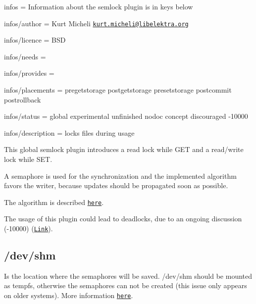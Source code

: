 
\begin{DoxyItemize}
\item infos = Information about the semlock plugin is in keys below
\item infos/author = Kurt Micheli \href{mailto:kurt.micheli@libelektra.org}{\tt kurt.\+micheli@libelektra.\+org}
\item infos/licence = B\+SD
\item infos/needs =
\item infos/provides =
\item infos/placements = pregetstorage postgetstorage presetstorage postcommit postrollback
\item infos/status = global experimental unfinished nodoc concept discouraged -\/10000
\item infos/description = locks files during usage
\end{DoxyItemize}

This global semlock plugin introduces a read lock while {\ttfamily G\+ET} and a read/write lock while {\ttfamily S\+ET}.

A semaphore is used for the synchronization and the implemented algorithm favors the writer, because updates should be propagated soon as possible.

The algorithm is described \href{https://en.wikipedia.org/wiki/Readers%E2%80%93writers_problem#Second_readers-writers_problem}{\tt here}.

The usage of this plugin could lead to deadlocks, due to an ongoing discussion (-\/10000) (\href{https://github.com/ElektraInitiative/libelektra/pull/555}{\tt Link}).

\subsection*{/dev/shm}

Is the location where the semaphores will be saved. {\ttfamily /dev/shm} should be mounted as tempfs, otherwise the semaphores can not be created (this issue only appears on older systems). More information \href{http://stackoverflow.com/questions/270113/how-do-i-stop-sem-open-failing-with-enosys}{\tt here}. 
